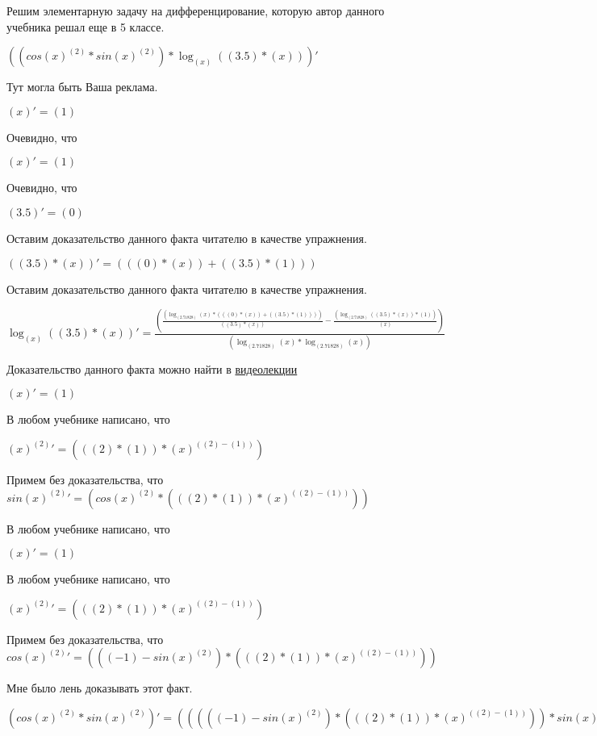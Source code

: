 \documentclass[12pt,a4paper,fleqn]{article}
\theoremstyle{definition}
\begin{document}
Решим элементарную задачу на дифференцирование, которую автор данного учебника решал еще в 5 классе.


$((cos{( x )}^{( 2 )} * sin{( x )}^{( 2 )}) * \log_{( x )}{(( 3.5 ) * ( x ))})'$

Тут могла быть Ваша реклама.

$( x )' = ( 1 )$

Очевидно, что

$( x )' = ( 1 )$

Очевидно, что

$( 3.5 )' = ( 0 )$

Оставим доказательство данного факта читателю в качестве упражнения.

$(( 3.5 ) * ( x ))' = ((( 0 ) * ( x )) + (( 3.5 ) * ( 1 )))$

Оставим доказательство данного факта читателю в качестве упражнения.

$\log_{( x )}{(( 3.5 ) * ( x ))}' = \frac{(\frac{(\log_{( 2.71828 )}{( x )} * ((( 0 ) * ( x )) + (( 3.5 ) * ( 1 ))))}{(( 3.5 ) * ( x ))}
 - \frac{(\log_{( 2.71828 )}{(( 3.5 ) * ( x ))} * ( 1 ))}{( x )}
)}{(\log_{( 2.71828 )}{( x )} * \log_{( 2.71828 )}{( x )})}
$

Доказательство данного факта можно найти в \href{https://www.youtube.com/watch?v=dQw4w9WgXcQ}{видеолекции}

$( x )' = ( 1 )$

В любом учебнике написано, что

${( x )}^{( 2 )}' = ((( 2 ) * ( 1 )) * {( x )}^{(( 2 ) - ( 1 ))})$

Примем без доказательства, что
$sin{( x )}^{( 2 )}' = (cos{( x )}^{( 2 )} * ((( 2 ) * ( 1 )) * {( x )}^{(( 2 ) - ( 1 ))}))$

В любом учебнике написано, что

$( x )' = ( 1 )$

В любом учебнике написано, что

${( x )}^{( 2 )}' = ((( 2 ) * ( 1 )) * {( x )}^{(( 2 ) - ( 1 ))})$

Примем без доказательства, что
$cos{( x )}^{( 2 )}' = ((( -1 ) - sin{( x )}^{( 2 )}) * ((( 2 ) * ( 1 )) * {( x )}^{(( 2 ) - ( 1 ))}))$

Мне было лень доказывать этот факт.

$(cos{( x )}^{( 2 )} * sin{( x )}^{( 2 )})' = ((((( -1 ) - sin{( x )}^{( 2 )}) * ((( 2 ) * ( 1 )) * {( x )}^{(( 2 ) - ( 1 ))})) * sin{( x )}^{( 2 )}) + (cos{( x )}^{( 2 )} * (cos{( x )}^{( 2 )} * ((( 2 ) * ( 1 )) * {( x )}^{(( 2 ) - ( 1 ))}))))$
\end{document}
